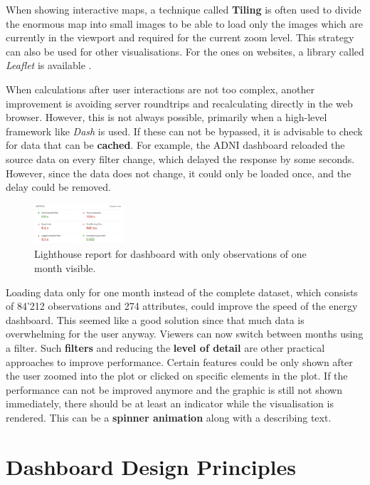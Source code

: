 \documentclass[11pt]{article}
\begin{document}
When showing interactive maps, a technique called \textbf{Tiling} is often used to divide the enormous map into small images to be able to load only the images which are currently in the viewport and required for the current zoom level. This strategy can also be used for other visualisations. For the ones on websites, a library called \textit{Leaflet} is available \parencite{noauthor_leaflet_2022}.

When calculations after user interactions are not too complex, another improvement is avoiding server roundtrips and recalculating directly in the web browser. However, this is not always possible, primarily when a high-level framework like \textit{Dash} is used. If these can not be bypassed, it is advisable to check for data that can be \textbf{cached}. For example, the ADNI dashboard reloaded the source data on every filter change, which delayed the response by some seconds. However, since the data does not change, it could only be loaded once, and the delay could be removed.

\begin{figure}
    \includegraphics[width=0.3\textwidth]{./lighthouse-2.png}
    \caption{Lighthouse report for dashboard with only observations of one month visible.}
\end{figure}

Loading data only for one month instead of the complete dataset, which consists of 84'212 observations and 274 attributes, could improve the speed of the energy dashboard. This seemed like a good solution since that much data is overwhelming for the user anyway. Viewers can now switch between months using a filter. Such \textbf{filters} and reducing the \textbf{level of detail} are other practical approaches to improve performance. Certain features could be only shown after the user zoomed into the plot or clicked on specific elements in the plot. If the performance can not be improved anymore and the graphic is still not shown immediately, there should be at least an indicator while the visualisation is rendered. This can be a \textbf{spinner animation} along with a describing text.

\pagebreak
\section{Dashboard Design Principles}
\end{document}
